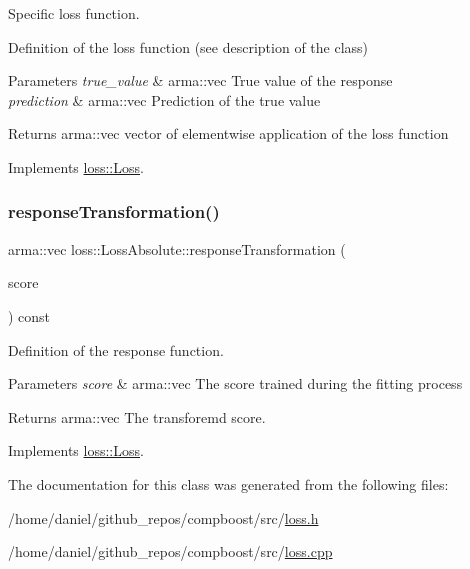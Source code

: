 Specific loss function. 

Definition of the loss function (see description of the class)


\begin{DoxyParams}{Parameters}
{\em true\+\_\+value} & {\ttfamily arma\+::vec} True value of the response \\
\hline
{\em prediction} & {\ttfamily arma\+::vec} Prediction of the true value\\
\hline
\end{DoxyParams}
\begin{DoxyReturn}{Returns}
{\ttfamily arma\+::vec} vector of elementwise application of the loss function 
\end{DoxyReturn}


Implements \hyperlink{classloss_1_1_loss_ae9f94dd9b8311397583ba3a9cb485e94}{loss\+::\+Loss}.

\mbox{\label{classloss_1_1_loss_absolute_a490d0fdab3e1af9cddbca77b8170263a}} 
\subsubsection{\texorpdfstring{response\+Transformation()}{responseTransformation()}}
{\footnotesize\ttfamily arma\+::vec loss\+::\+Loss\+Absolute\+::response\+Transformation (\begin{DoxyParamCaption}\item[{const arma\+::vec \&}]{score }\end{DoxyParamCaption}) const\hspace{0.3cm}{\ttfamily [virtual]}}



Definition of the response function. 


\begin{DoxyParams}{Parameters}
{\em score} & {\ttfamily arma\+::vec} The score trained during the fitting process\\
\hline
\end{DoxyParams}
\begin{DoxyReturn}{Returns}
{\ttfamily arma\+::vec} The transforemd score. 
\end{DoxyReturn}


Implements \hyperlink{classloss_1_1_loss_a0a84b7df79b08e40b538aaa7e6ee75c4}{loss\+::\+Loss}.



The documentation for this class was generated from the following files\+:\begin{DoxyCompactItemize}
\item 
/home/daniel/github\+\_\+repos/compboost/src/\hyperlink{loss_8h}{loss.\+h}\item 
/home/daniel/github\+\_\+repos/compboost/src/\hyperlink{loss_8cpp}{loss.\+cpp}\end{DoxyCompactItemize}
